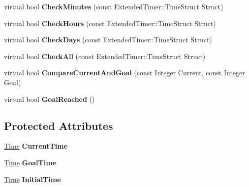 \begin{DoxyCompactItemize}
\item 
\hypertarget{classphys_1_1ExtendedTimer_a14ed25abe8070ba5e016e9c45c6974d6}{
virtual bool {\bfseries CheckMinutes} (const ExtendedTimer::TimeStruct Struct)}
\label{dc/d7c/classphys_1_1ExtendedTimer_a14ed25abe8070ba5e016e9c45c6974d6}

\item 
\hypertarget{classphys_1_1ExtendedTimer_aee17ef0ce61f2d587ff6734ca54a5747}{
virtual bool {\bfseries CheckHours} (const ExtendedTimer::TimeStruct Struct)}
\label{dc/d7c/classphys_1_1ExtendedTimer_aee17ef0ce61f2d587ff6734ca54a5747}

\item 
\hypertarget{classphys_1_1ExtendedTimer_a9782d2866e39777ebfa2193460a1c457}{
virtual bool {\bfseries CheckDays} (const ExtendedTimer::TimeStruct Struct)}
\label{dc/d7c/classphys_1_1ExtendedTimer_a9782d2866e39777ebfa2193460a1c457}

\item 
\hypertarget{classphys_1_1ExtendedTimer_af92fcaca7cea1a2d48f7411b1b18223f}{
virtual bool {\bfseries CheckAll} (const ExtendedTimer::TimeStruct Struct)}
\label{dc/d7c/classphys_1_1ExtendedTimer_af92fcaca7cea1a2d48f7411b1b18223f}

\item 
\hypertarget{classphys_1_1ExtendedTimer_ae71b57d5a274f77edb37a9606eaa02bb}{
virtual bool {\bfseries CompareCurrentAndGoal} (const \hyperlink{namespacephys_a7f09bf5585b2bb97613cd9aad4273a81}{Integer} Current, const \hyperlink{namespacephys_a7f09bf5585b2bb97613cd9aad4273a81}{Integer} Goal)}
\label{dc/d7c/classphys_1_1ExtendedTimer_ae71b57d5a274f77edb37a9606eaa02bb}

\item 
\hypertarget{classphys_1_1ExtendedTimer_ae3684bd4b2638617e86df3cb78813ce6}{
virtual bool {\bfseries GoalReached} ()}
\label{dc/d7c/classphys_1_1ExtendedTimer_ae3684bd4b2638617e86df3cb78813ce6}

\end{DoxyCompactItemize}
\subsection*{Protected Attributes}
\begin{DoxyCompactItemize}
\item 
\hypertarget{classphys_1_1ExtendedTimer_aa71c8250d0a9953b00e25391c8e6d910}{
\hyperlink{structphys_1_1Time}{Time} {\bfseries CurrentTime}}
\label{dc/d7c/classphys_1_1ExtendedTimer_aa71c8250d0a9953b00e25391c8e6d910}

\item 
\hypertarget{classphys_1_1ExtendedTimer_a6dd2ddfeaf989e2c70dc8afd399d8ca8}{
\hyperlink{structphys_1_1Time}{Time} {\bfseries GoalTime}}
\label{dc/d7c/classphys_1_1ExtendedTimer_a6dd2ddfeaf989e2c70dc8afd399d8ca8}

\item 
\hypertarget{classphys_1_1ExtendedTimer_a231bf60b0b65a41095b6a4c140596531}{
\hyperlink{structphys_1_1Time}{Time} {\bfseries InitialTime}}
\label{dc/d7c/classphys_1_1ExtendedTimer_a231bf60b0b65a41095b6a4c140596531}

\end{DoxyCompactItemize}


